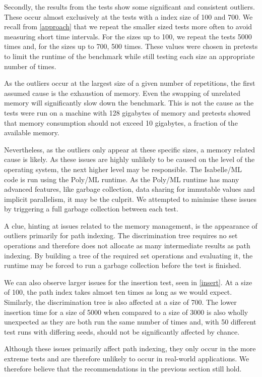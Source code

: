 Secondly, the results from the tests show some significant and consistent outliers. These occur almost exclusively at the tests with a index size of 100 and 700. We recall from \cref{approach} that we repeat the smaller sized tests more often to avoid measuring short time intervals. For the sizes up to 100, we repeat the tests 5000 times and, for the sizes up to 700, 500 times. These values were chosen in pretests to limit the runtime of the benchmark while still testing each size an appropriate number of times.

As the outliers occur at the largest size of a given number of repetitions, the first assumed cause is the exhaustion of memory. Even the swapping of unrelated memory will significantly slow down the benchmark. This is not the cause as the tests were run on a machine with 128 gigabytes of memory and pretests showed that memory consumption should not exceed 10 gigabytes, a fraction of the available memory.

Nevertheless, as the outliers only appear at these specific sizes, a memory related cause is likely. As these issues are highly unlikely to be caused on the level of the operating system, the next higher level may be responsible. The Isabelle/ML code is run using the Poly/ML runtime. As the Poly/ML runtime has many advanced features, like garbage collection, data sharing for immutable values and implicit parallelism, it may be the culprit. We attempted to minimise these issues by triggering a full garbage collection between each test.

A clue, hinting at issues related to the memory management, is the appearance of outliers primarily for path indexing. The discrimination tree requires no set operations and therefore does not allocate as many intermediate results as path indexing. By building a tree of the required set operations and evaluating it, the runtime may be forced to run a garbage collection before the test is finished.

We can also observe larger issues for the insertion test, seen in \cref{insert}. At a size of 100, the path index takes almost ten times as long as we would expect. Similarly, the discrimination tree is also affected at a size of 700. The lower insertion time for a size of 5000 when compared to a size of 3000 is also wholly unexpected as they are both run the same number of times and, with 50 different test runs with differing seeds, should not be significantly affected by chance.

Although these issues primarily affect path indexing, they only occur in the more extreme tests and are therefore unlikely to occur in real-world applications. We therefore believe that the recommendations in the previous section still hold.
